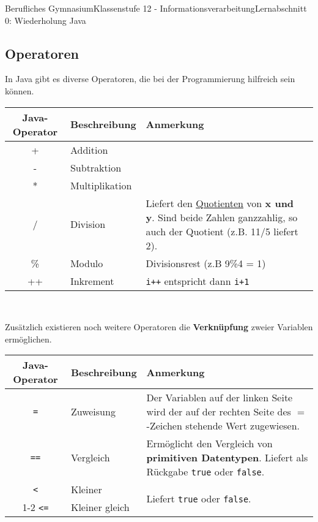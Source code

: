 \documentclass[11pt,oneside,openany,headings=optiontotoc,11pt,numbers=noenddot]{article}
\begin{document}
\begin{worksheet}{Berufliches Gymnasium}{Klassenstufe 12 - Informationsverarbeitung}{Lernabschnitt 0: Wiederholung Java}
		\subsection{Operatoren}
		In Java gibt es diverse Operatoren, die bei der Programmierung hilfreich sein können.\\
		\par\noindent
		\begin{tabularx}{\textwidth}{clXX}
			\textbf{Java-Operator} & \textbf{Beschreibung} & \textbf{Anmerkung}\\
			\hline
			\hline
			+ & Addition & \\
			\hline
			- & Subtraktion & \\
			\hline
			* & Multiplikation & \\
			\hline
			/ & Division & Liefert den \underline{Quotienten} von \textbf{x und y}. Sind beide Zahlen ganzzahlig, so auch der Quotient (z.B. 11/5 liefert 2).\\
			\hline
			\% & Modulo & Divisionsrest (z.B 9\%4 = 1)\\
			\hline
			++ & Inkrement & {\lstinline[style=JavaInputStyle]{i++}} entspricht dann {\lstinline[style=JavaInputStyle]{i+1}}\\
			\hline
			\hline
		\end{tabularx}\\
		\par\noindent
		Zusätzlich existieren noch weitere Operatoren die \textbf{Verknüpfung} zweier Variablen ermöglichen.\\
		\begin{tabularx}{\textwidth}{cXX}
			\textbf{Java-Operator} & \textbf{Beschreibung} & \textbf{Anmerkung}\\
			\hline
			\hline
			{\lstinline[style=JavaInputStyle]{=}} & Zuweisung & Der Variablen auf der linken Seite wird der auf der rechten Seite des \(=\)-Zeichen stehende Wert zugewiesen.\\
			\hline
			{\lstinline[style=JavaInputStyle]{==}} & Vergleich & Ermöglicht den Vergleich von \textbf{primitiven Datentypen}. Liefert als Rückgabe {\lstinline[style=JavaInputStyle]{true}} oder {\lstinline[style=JavaInputStyle]{false}}.\\
			\hline
			{\lstinline[style=JavaInputStyle]{<}} & Kleiner & \multirow{4}{*}{Liefert {\lstinline[style=JavaInputStyle]{true}} oder {\lstinline[style=JavaInputStyle]{false}}.}\\
			\cline{1-2}
			{\lstinline[style=JavaInputStyle]{<=}} & Kleiner gleich & \\

\end{tabularx}
\end{worksheet}
\end{document}
